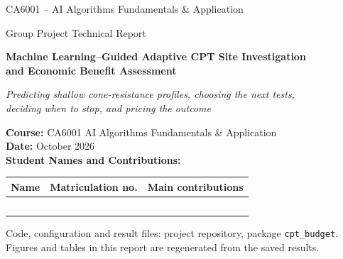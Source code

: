 \begin{titlepage}
\centering
\vspace*{2.2cm}
{\large CA6001 -- AI Algorithms Fundamentals \& Application\par}
\vspace{2pt}
{Group Project Technical Report\par}
\vspace{1.8cm}
{\Large\bfseries Machine Learning--Guided Adaptive CPT Site Investigation\\[6pt]
and Economic Benefit Assessment\par}
\vspace{0.7cm}
{\normalsize\itshape Predicting shallow cone-resistance profiles, choosing the next tests,\\
deciding when to stop, and pricing the outcome\par}
\vspace{2.2cm}

\begin{flushleft}
\textbf{Course:} CA6001 AI Algorithms Fundamentals \& Application\\[4pt]
\textbf{Date:} October 2026\\[14pt]
\textbf{Student Names and Contributions:}\\[4pt]
\renewcommand{\arraystretch}{1.5}
\begin{tabularx}{\linewidth}{@{}p{4.6cm}p{3.0cm}X@{}}
\toprule
Name & Matriculation no. & Main contributions\\
\midrule
 & & \\
 & & \\
 & & \\
 & & \\
 & & \\
\bottomrule
\end{tabularx}
\end{flushleft}

\vfill
{\small Code, configuration and result files: project repository, package \texttt{cpt\_budget}.
Figures and tables in this report are regenerated from the saved results.\par}
\end{titlepage}

